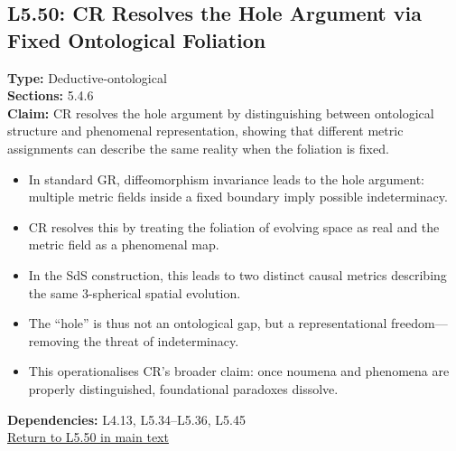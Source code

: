 \documentclass[12pt]{book}
\newcommand{\returnlink}[1]{\hyperref[logic:#1]{Return to #1 in main text}\xspace}
\begin{document}
\subsection*{L5.50: CR Resolves the Hole Argument via Fixed Ontological Foliation}
\label{appendix:L5.50}
\textbf{Type:} Deductive-ontological \\
\textbf{Sections:} 5.4.6 \\
\textbf{Claim:} CR resolves the hole argument by distinguishing between ontological structure and phenomenal representation, showing that different metric assignments can describe the same reality when the foliation is fixed. 
\begin{itemize}
  \item In standard GR, diffeomorphism invariance leads to the hole argument: multiple metric fields inside a fixed boundary imply possible indeterminacy.
  \item CR resolves this by treating the foliation of evolving space as real and the metric field as a phenomenal map.
  \item In the SdS construction, this leads to two distinct causal metrics describing the same 3-spherical spatial evolution.
  \item The ``hole'' is thus not an ontological gap, but a representational freedom---removing the threat of indeterminacy.
  \item This operationalises CR's broader claim: once noumena and phenomena are properly distinguished, foundational paradoxes dissolve.
\end{itemize}
\textbf{Dependencies:} L4.13, L5.34–L5.36, L5.45 \\
\returnlink{L5.50}
\end{document}
